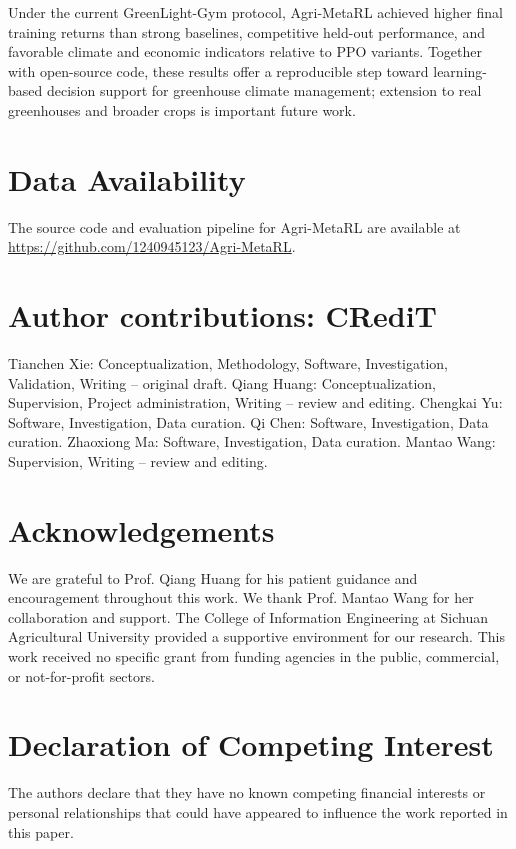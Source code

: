 \documentclass[number,preprint,review,12pt]{elsarticle}
\begin{document}
Under the current GreenLight-Gym protocol, Agri-MetaRL achieved higher final training returns than strong baselines, competitive held-out performance, and favorable climate and economic indicators relative to PPO variants. Together with open-source code, these results offer a reproducible step toward learning-based decision support for greenhouse climate management; extension to real greenhouses and broader crops is important future work.

\section*{Data Availability}
The source code and evaluation pipeline for Agri-MetaRL are available at \url{https://github.com/1240945123/Agri-MetaRL}.

\section*{Author contributions: CRediT}
Tianchen Xie: Conceptualization, Methodology, Software, Investigation, Validation, Writing -- original draft. Qiang Huang: Conceptualization, Supervision, Project administration, Writing -- review and editing. Chengkai Yu: Software, Investigation, Data curation. Qi Chen: Software, Investigation, Data curation. Zhaoxiong Ma: Software, Investigation, Data curation. Mantao Wang: Supervision, Writing -- review and editing.

\section*{Acknowledgements}
We are grateful to Prof. Qiang Huang for his patient guidance and encouragement throughout this work. We thank Prof. Mantao Wang for her collaboration and support. The College of Information Engineering at Sichuan Agricultural University provided a supportive environment for our research. This work received no specific grant from funding agencies in the public, commercial, or not-for-profit sectors.

\section*{Declaration of Competing Interest}
The authors declare that they have no known competing financial interests or personal relationships that could have appeared to influence the work reported in this paper.




\end{document}
